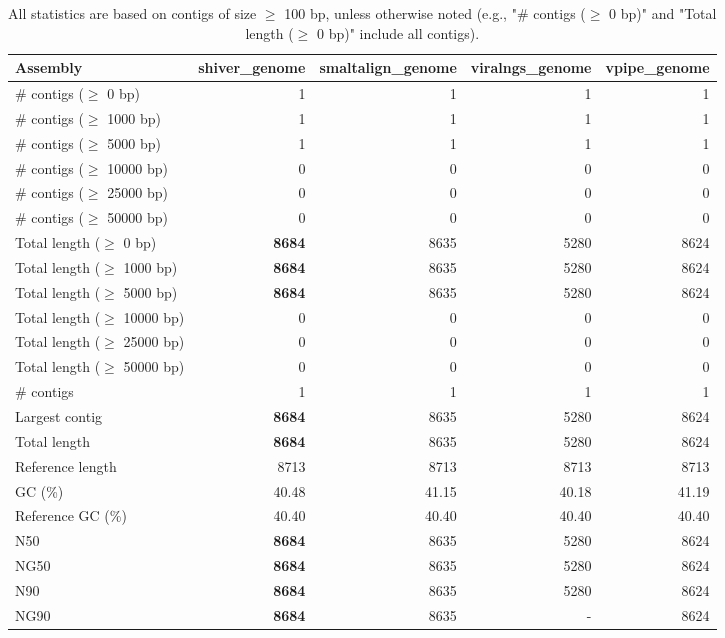 \documentclass[12pt,a4paper]{article}
\begin{document}
\begin{table}[ht]
\begin{center}
\caption{All statistics are based on contigs of size $\geq$ 100 bp, unless otherwise noted (e.g., "\# contigs ($\geq$ 0 bp)" and "Total length ($\geq$ 0 bp)" include all contigs).}
\begin{tabular}{|l*{4}{|r}|}
\hline
Assembly & shiver\_genome & smaltalign\_genome & viralngs\_genome & vpipe\_genome \\ \hline
\# contigs ($\geq$ 0 bp) & 1 & 1 & 1 & 1 \\ \hline
\# contigs ($\geq$ 1000 bp) & 1 & 1 & 1 & 1 \\ \hline
\# contigs ($\geq$ 5000 bp) & 1 & 1 & 1 & 1 \\ \hline
\# contigs ($\geq$ 10000 bp) & 0 & 0 & 0 & 0 \\ \hline
\# contigs ($\geq$ 25000 bp) & 0 & 0 & 0 & 0 \\ \hline
\# contigs ($\geq$ 50000 bp) & 0 & 0 & 0 & 0 \\ \hline
Total length ($\geq$ 0 bp) & {\bf 8684} & 8635 & 5280 & 8624 \\ \hline
Total length ($\geq$ 1000 bp) & {\bf 8684} & 8635 & 5280 & 8624 \\ \hline
Total length ($\geq$ 5000 bp) & {\bf 8684} & 8635 & 5280 & 8624 \\ \hline
Total length ($\geq$ 10000 bp) & 0 & 0 & 0 & 0 \\ \hline
Total length ($\geq$ 25000 bp) & 0 & 0 & 0 & 0 \\ \hline
Total length ($\geq$ 50000 bp) & 0 & 0 & 0 & 0 \\ \hline
\# contigs & 1 & 1 & 1 & 1 \\ \hline
Largest contig & {\bf 8684} & 8635 & 5280 & 8624 \\ \hline
Total length & {\bf 8684} & 8635 & 5280 & 8624 \\ \hline
Reference length & 8713 & 8713 & 8713 & 8713 \\ \hline
GC (\%) & 40.48 & 41.15 & 40.18 & 41.19 \\ \hline
Reference GC (\%) & 40.40 & 40.40 & 40.40 & 40.40 \\ \hline
N50 & {\bf 8684} & 8635 & 5280 & 8624 \\ \hline
NG50 & {\bf 8684} & 8635 & 5280 & 8624 \\ \hline
N90 & {\bf 8684} & 8635 & 5280 & 8624 \\ \hline
NG90 & {\bf 8684} & 8635 & - & 8624 \\ \hline

\end{tabular}
\end{center}
\end{table}
\end{document}

